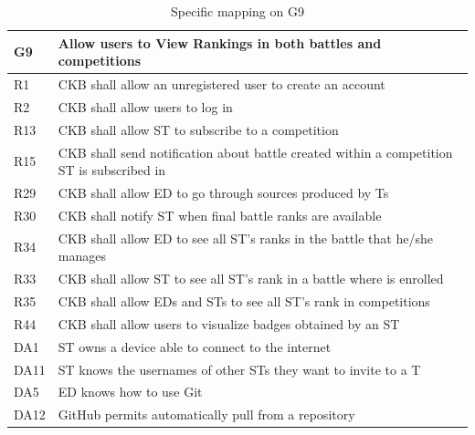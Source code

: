   \begin{table}[H]
    \begin{longtable}{|l|p{12cm}|}
      \hline
      \textbf{G9} & \textbf{Allow users to View Rankings in both battles and competitions}      \\
      \hline
      R1 & CKB shall allow an unregistered user to create an account \\
      \hline
      R2 & CKB shall allow users to log in \\
      \hline
      R13 & CKB shall allow ST to subscribe to a competition \\
      \hline
      R15 & CKB shall send notification about battle created within a competition ST is subscribed in \\
      \hline
      R29 & CKB shall allow ED to go through sources produced by Ts \\
      \hline
      R30 & CKB shall notify ST when final battle ranks are available \\
      \hline
      R34 & CKB shall allow ED to see all ST’s ranks in the battle that he/she manages \\
      \hline
      R33 & CKB shall allow ST to see all ST’s rank in a battle where is enrolled \\
      \hline
      R35 & CKB shall allow EDs and STs to see all ST’s rank in competitions \\
      \hline
      R44 & CKB shall allow users to visualize badges obtained by an ST \\
      \hline
      DA1 & ST owns a device able to connect to the internet \\
      \hline
      DA11 & ST knows the usernames of other STs they want to invite to a T \\
      \hline
      DA5 & ED knows how to use Git \\
      \hline
      DA12 & GitHub permits automatically pull from a repository \\
      \hline
    \end{longtable}
    \caption{Specific mapping on G9}
    \label{tab:mappingG9}
  \end{table}

